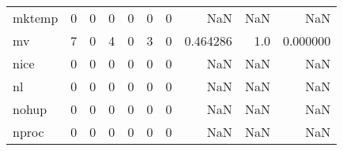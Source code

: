 \begin{tabular}{lrrrrrrrrr}
mktemp    &                                                  0 &                                                  0 &                                                  0 &                                                  0 &                                                  0 &                                                  0 &                                                NaN &                                    NaN &                                  NaN \\
mv        &                                                  7 &                                                  0 &                                                  4 &                                                  0 &                                                  3 &                                                  0 &                                           0.464286 &                                    1.0 &                             0.000000 \\
nice      &                                                  0 &                                                  0 &                                                  0 &                                                  0 &                                                  0 &                                                  0 &                                                NaN &                                    NaN &                                  NaN \\
nl        &                                                  0 &                                                  0 &                                                  0 &                                                  0 &                                                  0 &                                                  0 &                                                NaN &                                    NaN &                                  NaN \\
nohup     &                                                  0 &                                                  0 &                                                  0 &                                                  0 &                                                  0 &                                                  0 &                                                NaN &                                    NaN &                                  NaN \\
nproc     &                                                  0 &                                                  0 &                                                  0 &                                                  0 &                                                  0 &                                                  0 &                                                NaN &                                    NaN &                                  NaN \\

\end{tabular}
